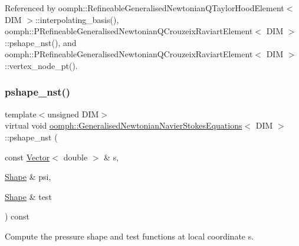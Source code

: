 Referenced by oomph\+::\+Refineable\+Generalised\+Newtonian\+Q\+Taylor\+Hood\+Element$<$ D\+I\+M $>$\+::interpolating\+\_\+basis(), oomph\+::\+P\+Refineable\+Generalised\+Newtonian\+Q\+Crouzeix\+Raviart\+Element$<$ D\+I\+M $>$\+::pshape\+\_\+nst(), and oomph\+::\+P\+Refineable\+Generalised\+Newtonian\+Q\+Crouzeix\+Raviart\+Element$<$ D\+I\+M $>$\+::vertex\+\_\+node\+\_\+pt().

\mbox{\label{classoomph_1_1GeneralisedNewtonianNavierStokesEquations_afb01a54f377b1bebe141ed8e11ced138}} 
\subsubsection{\texorpdfstring{pshape\+\_\+nst()}{pshape\_nst()}\hspace{0.1cm}{\footnotesize\ttfamily [2/2]}}
{\footnotesize\ttfamily template$<$unsigned D\+IM$>$ \\
virtual void \hyperlink{classoomph_1_1GeneralisedNewtonianNavierStokesEquations}{oomph\+::\+Generalised\+Newtonian\+Navier\+Stokes\+Equations}$<$ D\+IM $>$\+::pshape\+\_\+nst (\begin{DoxyParamCaption}\item[{const \hyperlink{classoomph_1_1Vector}{Vector}$<$ double $>$ \&}]{s,  }\item[{\hyperlink{classoomph_1_1Shape}{Shape} \&}]{psi,  }\item[{\hyperlink{classoomph_1_1Shape}{Shape} \&}]{test }\end{DoxyParamCaption}) const\hspace{0.3cm}{\ttfamily [pure virtual]}}



Compute the pressure shape and test functions at local coordinate s. 



